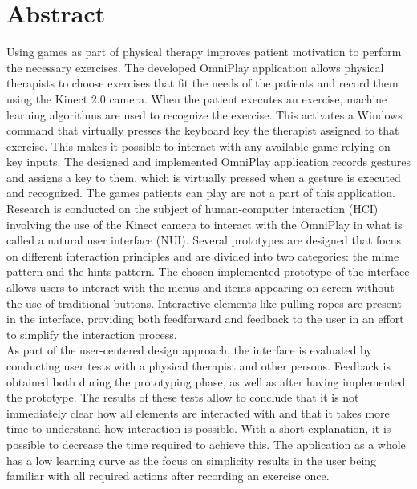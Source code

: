 \chapter*{Abstract}

Using games as part of physical therapy improves patient motivation to perform the necessary exercises. The developed OmniPlay application allows physical therapists to choose exercises that fit the needs of the patients and record them using the Kinect 2.0 camera. When the patient executes an exercise, machine learning algorithms are used to recognize the exercise. This activates a Windows command that virtually presses the keyboard key the therapist assigned to that exercise. This makes it possible to interact with any available game relying on key inputs. The designed and implemented OmniPlay application records gestures and assigns a key to them, which is virtually pressed when a gesture is executed and recognized. The games patients can play are not a part of this application.\\

Research is conducted on the subject of human-computer interaction (HCI) involving the use of the Kinect camera to interact with the OmniPlay in what is called a natural user interface (NUI). Several prototypes are designed that focus on different interaction principles and are divided into two categories: the mime pattern and the hints pattern. The chosen implemented prototype of the interface allows users to interact with the menus and items appearing on-screen without the use of traditional buttons. Interactive elements like pulling ropes are present in the interface, providing both feedforward and feedback to the user in an effort to simplify the interaction process.\\

As part of the user-centered design approach, the interface is evaluated by conducting user tests with a physical therapist and other persons. Feedback is obtained both during the prototyping phase, as well as after having implemented the prototype. The results of these tests allow to conclude that it is not immediately clear how all elements are interacted with and that it takes more time to understand how interaction is possible. With a short explanation, it is possible to decrease the time required to achieve this. The application as a whole has a low learning curve as the focus on simplicity results in the user being familiar with all required actions after recording an exercise once.\\

